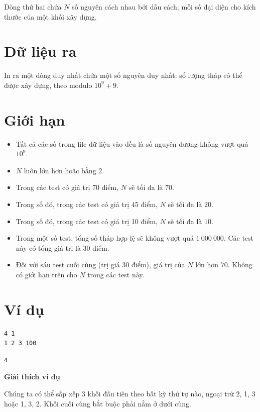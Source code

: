 \documentclass[12pt,a4paper]{article}
\newcommand{\explanation}{%
  \vspace{6pt}\textbf{\textcolor{sectioncolor}{Giải thích ví dụ}}\par\vspace{2pt}%
}
\begin{document}
Dòng thứ hai chứa $N$ số nguyên cách nhau bởi dấu cách; mỗi số đại diện cho kích thước của một khối xây dựng.

\section*{Dữ liệu ra}
In ra một dòng duy nhất chứa một số nguyên duy nhất: số lượng tháp có thể được xây dựng, theo modulo $10^9 + 9$.

\section*{Giới hạn}
\begin{constraintbox}
\begin{itemize}
    \item Tất cả các số trong file dữ liệu vào đều là số nguyên dương không vượt quá $10^9$.
    \item $N$ luôn lớn hơn hoặc bằng $2$.
    \item Trong các test có giá trị 70 điểm, $N$ sẽ tối đa là $70$.
    \item Trong số đó, trong các test có giá trị 45 điểm, $N$ sẽ tối đa là $20$.
    \item Trong số đó, trong các test có giá trị 10 điểm, $N$ sẽ tối đa là $10$.
    \item Trong một số test, tổng số tháp hợp lệ sẽ không vượt quá $1\ 000\ 000$. Các test này có tổng giá trị là 30 điểm.
    \item Đối với sáu test cuối cùng (trị giá 30 điểm), giá trị của $N$ lớn hơn $70$. Không có giới hạn trên cho $N$ trong các test này.
\end{itemize}
\end{constraintbox}

\section*{Ví dụ}
\begin{inputbox}
\begin{lstlisting}
4 1
1 2 3 100
\end{lstlisting}
\end{inputbox}
\begin{outputbox}
\begin{lstlisting}
4
\end{lstlisting}
\end{outputbox}

\explanation
Chúng ta có thể sắp xếp 3 khối đầu tiên theo bất kỳ thứ tự nào, ngoại trừ 2, 1, 3 hoặc 1, 3, 2. Khối cuối cùng bắt buộc phải nằm ở dưới cùng.
\end{document}
